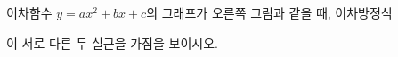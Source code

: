 \noindent\begin{minipage}[t]{0.58\linewidth}\vspace{0pt}\raggedright 이차함수 $y=ax^2+bx+c$의 그래프가 오른쪽 그림과 같을 때, 이차방정식 \par\smallskip\end{minipage}\hfill\begin{minipage}[t]{0.4\linewidth}\vspace{0pt}\centering \resizebox{\ifdim\width>\linewidth\linewidth\else\width\fi}{!}{}\end{minipage}\par
\noindent {}\par\smallskip\noindent 이 서로 다른 두 실근을 가짐을 보이시오. 

